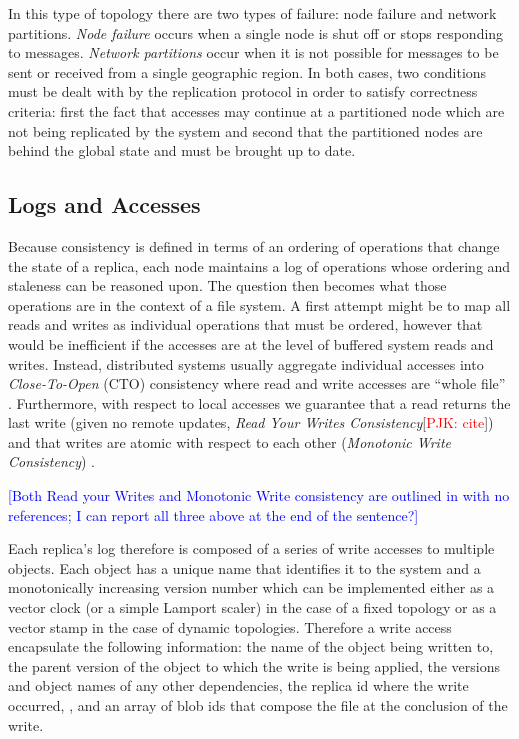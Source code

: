 \documentclass[10pt,conference,letterpaper]{IEEEtran}
\newcommand{\todo}[1]{{\textcolor{red}{#1}}}
\newcommand{\pjk}[1]{[\todo{PJK: #1}]}
\newcommand{\note}[1]{\textcolor{blue}{[#1]}}
\begin{document}
In this type of topology there are two types of failure: node failure and network partitions. \textit{Node failure} occurs when a single node is shut off or stops responding to messages. \textit{Network partitions} occur when it is not possible for messages to be sent or received from a single geographic region. In both cases, two conditions must be dealt with by the replication protocol in order to satisfy correctness criteria: first the fact that accesses may continue at a partitioned node which are not being replicated by the system and second that the partitioned nodes are behind the global state and must be brought up to date.

\subsection{Logs and Accesses}

Because consistency is defined in terms of an ordering of operations that change the state of a replica, each node maintains a log of operations whose ordering and staleness can be reasoned upon. The question then becomes what those operations are in the context of a file system. A first attempt might be to map all reads and writes as individual operations that must be ordered, however that would be inefficient if the accesses are at the level of buffered system reads and writes. Instead, distributed systems usually aggregate individual accesses into \textit{Close-To-Open} (CTO) consistency where read and write accesses are ``whole file'' \cite{muthitacharoen_low-bandwidth_2001}. Furthermore, with respect to local accesses we guarantee that a read returns the last write (given no remote updates, \textit{Read Your Writes Consistency}\pjk{cite}) and that writes are atomic with respect to each other (\textit{Monotonic Write Consistency}) \cite{bermbach_consistency_2013}.

\note{Both Read your Writes and Monotonic Write consistency are outlined in \cite{terry_session_1994,bermbach_consistency_2013,vogels_eventually_2009} with no references; I can report all three above at the end of the sentence?}

Each replica's log therefore is composed of a series of write accesses to multiple objects. Each object has a unique name that identifies it to the system and a monotonically increasing version number which can be implemented either as a vector clock \cite{parker_detection_1983} (or a simple Lamport scaler) in the case of a fixed topology or as a vector stamp \cite{almeida_version_2002} in the case of dynamic topologies. Therefore a write access encapsulate the following information: the name of the object being written to, the parent version of the object to which the write is being applied, the versions and object names of any other dependencies, the replica id where the write occurred, , and an array of blob ids that compose the file at the conclusion of the write.
\end{document}
